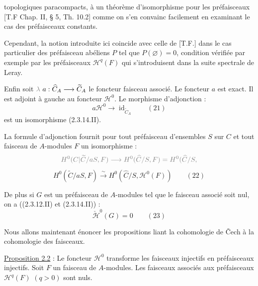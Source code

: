 topologiques paracompacts, à un théorème d'isomorphisme pour les  préfaisceaux [T.F Chap. II, § 5, Th. 10.2] comme on s'en convainc facilement en examinant le cas des préfaisceaux constants.

Cependant, la notion introduite ici coincide avec celle de [T.F.] dans le cas particulier des préfaisceau abéliens $P$ tel que $P(\varnothing)=0$, condition vérifiée par exemple par les préfaisceaux $\mathcal H^q(F)$  qui s'introduisent dans la suite spectrale de Leray.

Enfin soit $\deleted{\unsure{\lambda}}\ a:\widehat C_A\longrightarrow\widetilde C_A$ le foncteur faisceau associé. Le foncteur $a$ est exact. Il est adjoint à gauche au foncteur $\mathcal H^0$. Le morphisme d'adjonction :
\[a\mathcal H^0\longrightarrow\operatorname{id}_{\widetilde C_A}\qquad(21)\]
est un isomorphisme (2.3.14.II).

La formule d'adjonction fournit pour tout préfaisceau d'ensembles $S$ sur $C$ et tout faisceau de $A$-modules $F$ un isomorphisme :
\margin{$\unsure{\rho}\quad\unsure{\rho}$}
\[
\deleted{H^0(\unsure{C|\widetilde C}/aS,F)\unsure{\longrightarrow}H^0(\widehat C/S,F)=H^0(\widehat C/S,}
\]
\[H^0(\widetilde C/aS,F)\xrightarrow{\sim}H^0(\widehat C/S,\mathcal H^0(F))\qquad(22)\]

De plus si $G$ est un préfaisceau de $A$-modules tel que le faisceau associé soit nul, on a ((2.3.12.II) et (2.3.14.II)) :
\[\check{\mathcal H}^{0}(G)=0\qquad(23)\]

Nous allons maintenant énoncer les propositions liant la cohomologie de Čech à la cohomologie des faisceaux.

\uline{Proposition 2.2} : Le foncteur $\mathcal H^0$ transforme les faisceaux injectifs en préfaisceaux injectifs. Soit $F$ un faisceau de $A$-modules. Les faisceaux associés aux préfaisceaux $\mathcal H^q(F)$ $(q>0)$ sont nuls.

